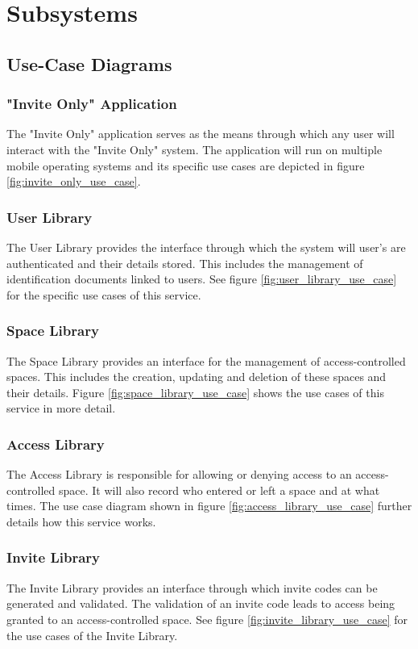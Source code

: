 \section{Subsystems}

\subsection{Use-Case Diagrams}

\subsubsection{"Invite Only" Application}
The "Invite Only" application serves as the means through which any user will interact with the "Invite Only" system. The application will run on multiple mobile operating systems and its specific use cases are depicted in figure \ref{fig:invite_only_use_case}.

\subsubsection{User Library}
The User Library provides the interface through which the system will user's are authenticated and their details stored. This includes the management of identification documents linked to users. See figure \ref{fig:user_library_use_case} for the specific use cases of this service.

\subsubsection{Space Library}
The Space Library provides an interface for the management of access-controlled spaces. This includes the creation, updating and deletion of these spaces and their details. Figure \ref{fig:space_library_use_case} shows the use cases of this service in more detail.

\subsubsection{Access Library}
The Access Library is responsible for allowing or denying access to an access-controlled space. It will also record who entered or left a space and at what times. The use case diagram shown in figure \ref{fig:access_library_use_case} further details how this service works.

\subsubsection{Invite Library}
The Invite Library provides an interface through which invite codes can be generated and validated. The validation of an invite code leads to access being granted to an access-controlled space. See figure \ref{fig:invite_library_use_case} for the use cases of the Invite Library.

